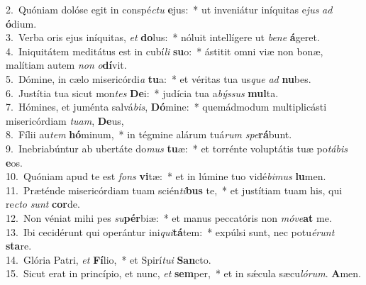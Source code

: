 {2.~}Quóniam dolóse egit in conspé\textit{ctu} \textbf{e}jus:~* ut inveniátur iníquitas e\textit{jus} \textit{ad} \textbf{ó}dium.\\
{3.~}Verba oris ejus iníquitas, \textit{et} \textbf{do}lus:~* nóluit intellígere ut \textit{be}\textit{ne} \textbf{á}geret.\\
{4.~}Iniquitátem meditátus est in cubí\textit{li} \textbf{su}o:~* ástitit omni viæ non bonæ, malítiam autem \textit{non} \textit{o}\textbf{dí}vit.\\
{5.~}Dómine, in cælo misericórdi\textit{a} \textbf{tu}a:~* et véritas tua us\textit{que} \textit{ad} \textbf{nu}bes.\\
{6.~}Justítia tua sicut mon\textit{tes} \textbf{De}i:~* judícia tua a\textit{býs}\textit{sus} \textbf{mul}ta.\\
{7.~}Hómines, et juménta salvá\textit{bis}, \textbf{Dó}mine:~* quemádmodum multiplicásti misericórdiam \textit{tu}\textit{am}, \textbf{De}us,\\
{8.~}Fílii au\textit{tem} \textbf{hó}minum,~* in tégmine alárum tuá\textit{rum} \textit{spe}\textbf{rá}bunt.\\
{9.~}Inebriabúntur ab ubertáte do\textit{mus} \textbf{tu}æ:~* et torrénte voluptátis tuæ po\textit{tá}\textit{bis} \textbf{e}os.\\
{10.~}Quóniam apud te est \textit{fons} \textbf{vi}tæ:~* et in lúmine tuo vidé\textit{bi}\textit{mus} \textbf{lu}men.\\
{11.~}Præténde misericórdiam tuam scién\textit{ti}\textbf{bus} te,~* et justítiam tuam his, qui re\textit{cto} \textit{sunt} \textbf{cor}de.\\
{12.~}Non véniat mihi pes \textit{su}\textbf{pér}biæ:~* et manus peccatóris non \textit{mó}\textit{ve}\textbf{at} me.\\
{13.~}Ibi cecidérunt qui operántur ini\textit{qui}\textbf{tá}tem:~* expúlsi sunt, nec potu\textit{é}\textit{runt} \textbf{sta}re.\\
{14.~}Glória Patri, \textit{et} \textbf{Fí}lio,~* et Spirí\textit{tu}\textit{i} \textbf{San}cto.\\
{15.~}Sicut erat in princípio, et nunc, \textit{et} \textbf{sem}per,~* et in sǽcula sæcu\textit{ló}\textit{rum}. \textbf{A}men.\\
